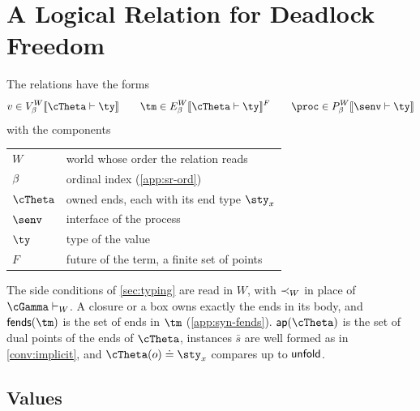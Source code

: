 \section{A Logical Relation for Deadlock Freedom}
\label{sec:relation}


\begin{definition}
\label{def:rel-anatomy}
The relations have the forms
\[
  v \in \Vrel{W}{\ix}{\cTheta}{\ty} \qquad
  \tm \in \Erel{W}{\ix}{\cTheta}{\ty}{F} \qquad
  \proc \in \Prel{W}{\ix}{\senv}{\ty}
\]
with the components
\begin{center}
\small
\begin{tabular}{@{}l@{\quad}l@{}}
  $W$ & world whose order the relation reads \\
  $\beta$ & ordinal index (\cref{app:sr-ord}) \\
  $\cTheta$ & owned ends, each with its end type $\sty_x$ \\
  $\senv$ & interface of the process \\
  $\ty$ & type of the value \\
  $F$ & future of the term, a finite set of points
\end{tabular}
\end{center}
The side conditions of \cref{sec:typing} are read in $W$, with $\prec_{W}$ in place of $\cGamma \vdash_W$. A closure or a box owns exactly the ends in its body, and $\fends(\tm)$ is the set of ends in $\tm$ (\cref{app:syn-fends}). $\ap(\cTheta)$ is the set of dual points of the ends of $\cTheta$, instances $\bar s$ are well formed as in \cref{conv:implicit}, and $\cTheta(o) \doteq \sty_x$ compares up to $\mathsf{unfold}$.
\end{definition}

\subsection{Values}
\label{sec:value-rel}



